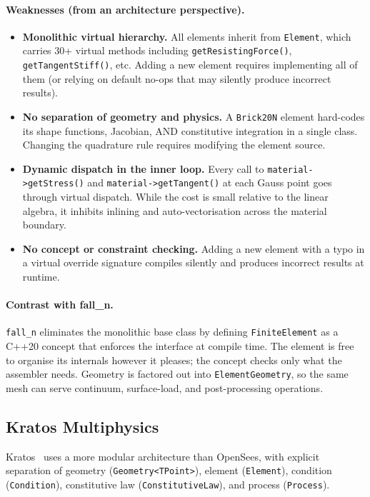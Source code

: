 \paragraph{Weaknesses (from an architecture perspective).}
\begin{itemize}[nosep]
  \item \textbf{Monolithic virtual hierarchy.}  All elements inherit from
        \texttt{Element}, which carries 30+ virtual methods including
        \texttt{getResistingForce()}, \texttt{getTangentStiff()}, etc.
        Adding a new element requires implementing all of them (or relying
        on default no-ops that may silently produce incorrect results).
  \item \textbf{No separation of geometry and physics.}  A \texttt{Brick20N}
        element hard-codes its shape functions, Jacobian, AND constitutive
        integration in a single class.  Changing the quadrature rule requires
        modifying the element source.
  \item \textbf{Dynamic dispatch in the inner loop.}  Every call to
        \texttt{material->getStress()} and \texttt{material->getTangent()}
        at each Gauss point goes through virtual dispatch.  While the cost
        is small relative to the linear algebra, it inhibits inlining and
        auto-vectorisation across the material boundary.
  \item \textbf{No concept or constraint checking.}  Adding a new element
        with a typo in a virtual override signature compiles silently and
        produces incorrect results at runtime.
\end{itemize}

\paragraph{Contrast with fall\_n.}
\texttt{fall\_n} eliminates the monolithic base class by defining
\texttt{FiniteElement} as a C++20 concept that enforces the interface at
compile time.  The element is free to organise its internals however it
pleases; the concept checks only what the assembler needs.  Geometry is
factored out into \texttt{ElementGeometry}, so the same mesh can serve
continuum, surface-load, and post-processing operations.


\subsection{Kratos Multiphysics}

Kratos~\cite{Kratos} uses a more modular architecture than OpenSees, with
explicit separation of geometry (\texttt{Geometry<TPoint>}), element
(\texttt{Element}), condition (\texttt{Condition}), constitutive law
(\texttt{ConstitutiveLaw}), and process (\texttt{Process}).

